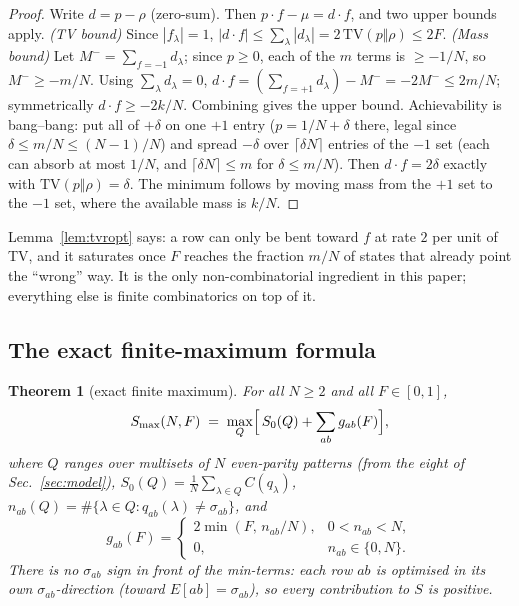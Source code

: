 \documentclass[aps,pra,reprint,superscriptaddress,floatfix]{revtex4-2}
\newcommand{\TV}{\mathrm{TV}}
\newtheorem{theorem}{Theorem}
\begin{document}
\begin{proof}
Write $d=p-\rho$ (zero-sum). Then $p\!\cdot\! f-\mu=d\!\cdot\! f$, and two
upper bounds apply. \emph{(TV bound)} Since $|f_\lambda|=1$,
$|d\!\cdot\! f|\le\sum_\lambda|d_\lambda|=2\,\TV(p\Vert\rho)\le 2F$.
\emph{(Mass bound)} Let $M^-=\sum_{f=-1}d_\lambda$; since $p\ge0$, each of
the $m$ terms is $\ge -1/N$, so $M^-\ge -m/N$. Using $\sum_\lambda d_\lambda=0$,
$d\!\cdot\! f=(\sum_{f=+1}d_\lambda)-M^-=-2M^-\le 2m/N$; symmetrically
$d\!\cdot\! f\ge -2k/N$. Combining gives the upper bound. Achievability is
bang--bang: put all of $+\delta$ on one $+1$ entry ($p=1/N+\delta$ there,
legal since $\delta\le m/N\le (N-1)/N$) and spread $-\delta$ over
$\lceil\delta N\rceil$ entries of the $-1$ set (each can absorb at most
$1/N$, and $\lceil\delta N\rceil\le m$ for $\delta\le m/N$). Then
$d\!\cdot\! f=2\delta$ exactly with $\TV(p\Vert\rho)=\delta$. The minimum
follows by moving mass from the $+1$ set to the $-1$ set, where the available
mass is $k/N$.
\end{proof}

\noindent
Lemma~\ref{lem:tvropt} says: a row can only be bent toward $f$ at rate $2$ per
unit of TV, and it saturates once $F$ reaches the fraction $m/N$ of states
that already point the ``wrong'' way. It is the only non-combinatorial
ingredient in this paper; everything else is finite combinatorics on top of
it.

\subsection{The exact finite-maximum formula}

\begin{theorem}[exact finite maximum]
\label{thm:finitemax}
For all $N\ge2$ and all $F\in[0,1]$,
\begin{equation}
S_{\max}(N,F) \;=\; \max_{Q}\Bigl[\, S_0(Q) + \sum_{ab} g_{ab}(F)\Bigr],
\label{eq:thm1}
\end{equation}
where $Q$ ranges over multisets of $N$ even-parity patterns (from the eight
of Sec.~\ref{sec:model}),
$S_0(Q)=\frac1N\sum_{\lambda\in Q} C(q_\lambda)$,
$n_{ab}(Q)=\#\{\lambda\in Q:q_{ab}(\lambda)\ne\sigma_{ab}\}$, and
\begin{equation}
g_{ab}(F) = \begin{cases} 2\min(F,\,n_{ab}/N), & 0<n_{ab}<N,\\[2pt] 0, & n_{ab}\in\{0,N\}. \end{cases}
\label{eq:gdef}
\end{equation}
There is no $\sigma_{ab}$ sign in front of the min-terms: each row $ab$ is
optimised \emph{in its own $\sigma_{ab}$-direction} (toward
$E[ab]=\sigma_{ab}$), so every contribution to $S$ is positive.
\end{theorem}
\end{document}
